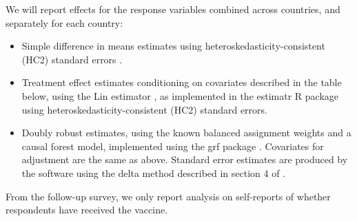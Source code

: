 \documentclass[letterpaper, 12pt, parskip=full,DIV=10]{scrartcl}
\begin{document}
We will report effects for the response variables combined across countries, and separately for each country:
\begin{itemize}
\item Simple difference in means estimates using heteroskedasticity-consistent (HC2) standard errors \citep{mackinnon1985some}.
\item Treatment effect estimates conditioning on covariates described in the table below, using the Lin estimator \citep{lin2013agnostic}, as implemented in the estimatr R package \citep{blair2021package} using heteroskedasticity-consistent (HC2) standard errors. 
\item Doubly robust estimates, using the known balanced assignment weights and a causal forest model, implemented using the grf package \citep{Tibshirani:2021}. Covariates for adjustment are the same as above. Standard error estimates are produced by the software using the delta method described in section 4 of \cite{athey2019generalized}. 
\end{itemize}

From the follow-up survey, we only report analysis on self-reports of whether respondents have received the vaccine. 

\clearpage




\clearpage
\end{document}

